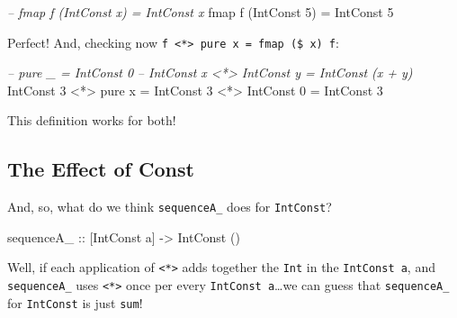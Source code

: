 \documentclass[]{article}
\newenvironment{Shaded}{}{}
\newcommand{\CommentTok}[1]{\textcolor[rgb]{0.38,0.63,0.69}{\textit{#1}}}
\newcommand{\DataTypeTok}[1]{\textcolor[rgb]{0.56,0.13,0.00}{#1}}
\newcommand{\DecValTok}[1]{\textcolor[rgb]{0.25,0.63,0.44}{#1}}
\newcommand{\FunctionTok}[1]{\textcolor[rgb]{0.02,0.16,0.49}{#1}}
\newcommand{\NormalTok}[1]{#1}
\newcommand{\OtherTok}[1]{\textcolor[rgb]{0.00,0.44,0.13}{#1}}
\begin{document}
\begin{Shaded}
\begin{Highlighting}[]
\CommentTok{-- fmap f (IntConst x) = IntConst x}
\NormalTok{fmap f (}\DataTypeTok{IntConst} \DecValTok{5}\NormalTok{) }\FunctionTok{=} \DataTypeTok{IntConst} \DecValTok{5}
\end{Highlighting}
\end{Shaded}

Perfect! And, checking now
\texttt{f\ \textless{}*\textgreater{}\ pure\ x\ =\ fmap\ (\$\ x)\ f}:

\begin{Shaded}
\begin{Highlighting}[]
\CommentTok{-- pure _ = IntConst 0}
\CommentTok{-- IntConst x <*> IntConst y = IntConst (x + y)}
\DataTypeTok{IntConst} \DecValTok{3} \FunctionTok{<*>}\NormalTok{ pure x }\FunctionTok{=} \DataTypeTok{IntConst} \DecValTok{3} \FunctionTok{<*>} \DataTypeTok{IntConst} \DecValTok{0}
                      \FunctionTok{=} \DataTypeTok{IntConst} \DecValTok{3}
\end{Highlighting}
\end{Shaded}

\begin{Shaded}
\end{Shaded}

This definition works for both!

\hypertarget{the-effect-of-const}{%
\subsection{The Effect of Const}\label{the-effect-of-const}}

And, so, what do we think \texttt{sequenceA\_} does for \texttt{IntConst}?

\begin{Shaded}
\begin{Highlighting}[]
\OtherTok{sequenceA_ ::}\NormalTok{ [}\DataTypeTok{IntConst}\NormalTok{ a] }\OtherTok{->} \DataTypeTok{IntConst}\NormalTok{ ()}
\end{Highlighting}
\end{Shaded}

Well, if each application of \texttt{\textless{}*\textgreater{}} adds together
the \texttt{Int} in the \texttt{IntConst\ a}, and \texttt{sequenceA\_} uses
\texttt{\textless{}*\textgreater{}} once per every
\texttt{IntConst\ a}\ldots{}we can guess that \texttt{sequenceA\_} for
\texttt{IntConst} is just \texttt{sum}!
\end{document}
